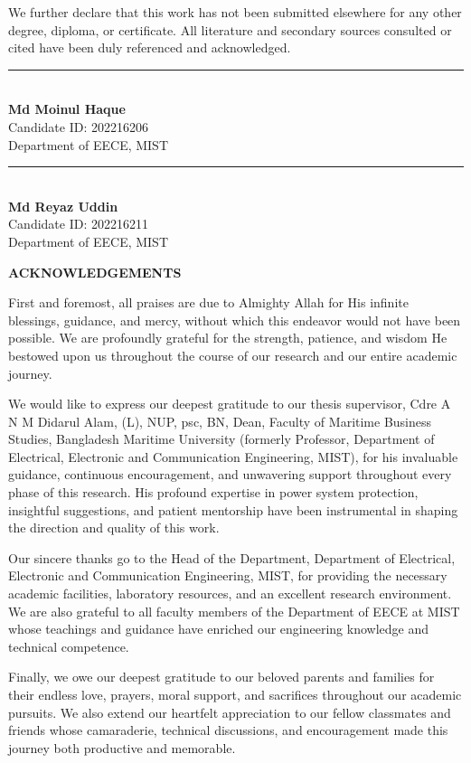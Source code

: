 \documentclass[12pt,a4paper,oneside]{report}
\newcommand{\frontchap}[1]{%
  \clearpage\phantomsection
  \begin{center}{\Large\bfseries\MakeUppercase{#1}}\end{center}\vspace{6pt}%
  \addcontentsline{toc}{chapter}{#1}}
\begin{document}
We further declare that this work has not been submitted elsewhere for any other degree, diploma, or certificate. All literature and secondary sources consulted or cited have been duly referenced and acknowledged.

\vspace{2.2in}
\begin{minipage}{0.48\textwidth}
\rule{5.8cm}{0.4pt}\\
\textbf{Md Moinul Haque}\\
Candidate ID: 202216206\\
Department of EECE, MIST
\end{minipage}\hfill
\begin{minipage}{0.48\textwidth}\raggedleft
\rule{5.8cm}{0.4pt}\\
\textbf{Md Reyaz Uddin}\\
Candidate ID: 202216211\\
Department of EECE, MIST
\end{minipage}

\frontchap{ACKNOWLEDGEMENTS}
First and foremost, all praises are due to Almighty Allah for His infinite blessings, guidance, and mercy, without which this endeavor would not have been possible. We are profoundly grateful for the strength, patience, and wisdom He bestowed upon us throughout the course of our research and our entire academic journey.

We would like to express our deepest gratitude to our thesis supervisor, Cdre A N M Didarul Alam, (L), NUP, psc, BN, Dean, Faculty of Maritime Business Studies, Bangladesh Maritime University (formerly Professor, Department of Electrical, Electronic and Communication Engineering, MIST), for his invaluable guidance, continuous encouragement, and unwavering support throughout every phase of this research. His profound expertise in power system protection, insightful suggestions, and patient mentorship have been instrumental in shaping the direction and quality of this work.

Our sincere thanks go to the Head of the Department, Department of Electrical, Electronic and Communication Engineering, MIST, for providing the necessary academic facilities, laboratory resources, and an excellent research environment. We are also grateful to all faculty members of the Department of EECE at MIST whose teachings and guidance have enriched our engineering knowledge and technical competence.

Finally, we owe our deepest gratitude to our beloved parents and families for their endless love, prayers, moral support, and sacrifices throughout our academic pursuits. We also extend our heartfelt appreciation to our fellow classmates and friends whose camaraderie, technical discussions, and encouragement made this journey both productive and memorable.
\end{document}
